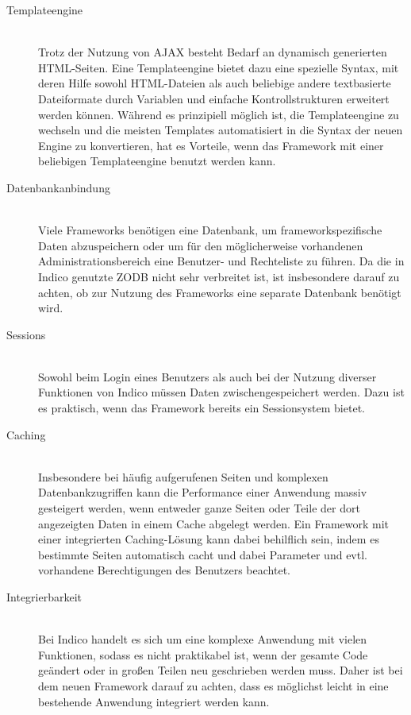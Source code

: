\begin{description}
\item[Templateengine] \hfill \\
Trotz der Nutzung von AJAX besteht Bedarf an dynamisch generierten HTML-Seiten. Eine Templateengine
bietet dazu eine spezielle Syntax, mit deren Hilfe sowohl HTML-Dateien als auch beliebige andere
textbasierte Dateiformate durch Variablen und einfache Kontrollstrukturen erweitert werden können.
Während es prinzipiell möglich ist, die Templateengine zu wechseln und die meisten Templates
automatisiert in die Syntax der neuen Engine zu konvertieren, hat es Vorteile, wenn das Framework
mit einer beliebigen Templateengine benutzt werden kann.

\item[Datenbankanbindung] \hfill \\
Viele Frameworks benötigen eine Datenbank, um frameworkspezifische Daten abzuspeichern oder um für
den möglicherweise vorhandenen Administrationsbereich eine Benutzer- und Rechteliste zu führen. Da
die in Indico genutzte ZODB nicht sehr verbreitet ist, ist insbesondere darauf zu achten, ob zur
Nutzung des Frameworks eine separate Datenbank benötigt wird.

\item[Sessions] \hfill \\
Sowohl beim Login eines Benutzers als auch bei der Nutzung diverser Funktionen von Indico müssen
Daten zwischengespeichert werden. Dazu ist es praktisch, wenn das Framework bereits ein
Sessionsystem bietet.

\item[Caching] \hfill \\
Insbesondere bei häufig aufgerufenen Seiten und komplexen Datenbankzugriffen kann die Performance
einer Anwendung massiv gesteigert werden, wenn entweder ganze Seiten oder Teile der dort
angezeigten Daten in einem Cache abgelegt werden. Ein Framework mit einer integrierten
Caching-Lösung kann dabei behilflich sein, indem es bestimmte Seiten automatisch
cacht und dabei Parameter und evtl. vorhandene Berechtigungen des Benutzers beachtet.

\item[Integrierbarkeit] \hfill \\
Bei Indico handelt es sich um eine komplexe Anwendung mit vielen Funktionen, sodass es nicht
praktikabel ist, wenn der gesamte Code geändert oder in großen Teilen neu geschrieben werden muss.
Daher ist bei dem neuen Framework darauf zu achten, dass es möglichst leicht in eine bestehende
Anwendung integriert werden kann.


\end{description}
